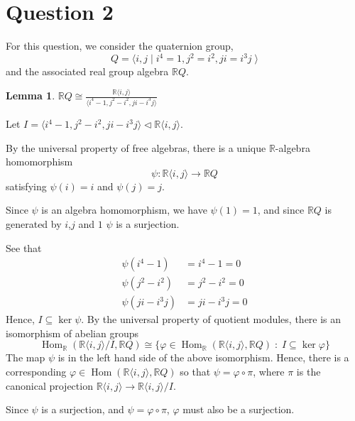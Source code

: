\documentclass[10pt]{article}
\newtheorem{lemma}[theorem]{Lemma}
\newenvironment{proof}[1][Proof]{\begin{trivlist}
\item[\hskip \labelsep {\bfseries #1}]}{\end{trivlist}}
\newcommand{\isom}{\cong}
\newcommand{\Hom}{\operatorname{Hom}}
\begin{document}
\section*{Question 2}
For this question, we consider the quaternion group,
\begin{equation*}
    Q = \langle i,j\;|\;i^4 = 1,j^2 = i^2,ji = i^3j\;\rangle
\end{equation*}
and the associated real group algebra $\mathbb{R}Q$.
\begin{lemma}
    $\mathbb{R}Q \isom \frac{\mathbb{R}\langle i,j\rangle}{\langle i^4-1,j^2-i^2,ji-i^3j\rangle}$
\end{lemma}
\begin{proof}
    Let $I = \langle i^4-1,j^2-i^2,ji-i^3j\rangle \lhd \mathbb{R}\langle i,j\rangle$. 
    
    By the universal property of free algebras, there is a unique $\mathbb{R}$-algebra
    homomorphism 
    \begin{equation*}
        \psi:\mathbb{R}\langle i,j\rangle \rightarrow \mathbb{R}Q
    \end{equation*}
    satisfying $\psi(i) = i$ and $\psi(j) = j$. 
    
    Since $\psi$ is an algebra homomorphism, we have $\psi(1) = 1$,
    and since $\mathbb{R}Q$ is generated by $i$,$j$ and $1$ 
    $\psi$ is a surjection.
    
    See that
    \begin{align*}
        \psi(i^4-1) &= i^4-1 = 0\\
        \psi(j^2-i^2) &= j^2-i^2 = 0\\
        \psi(ji-i^3j) &= ji-i^3j = 0
    \end{align*}
    Hence, $I\subseteq \ker\psi$. By the universal property of quotient modules,
    there is an isomorphism of abelian groups
    \begin{equation*}
        \Hom_\mathbb{R}(\mathbb{R}\langle i,j\rangle/I,\mathbb{R}Q) \isom \{\varphi\in\Hom_\mathbb{R}(\mathbb{R}\langle i,j\rangle,\mathbb{R}Q)\;:\;I\subseteq \ker\varphi\}
    \end{equation*}
    The map $\psi$ is in the left hand side of the above isomorphism. Hence, there is a corresponding
    $\varphi\in\Hom(\mathbb{R}\langle i,j\rangle,\mathbb{R}Q)$ so that $\psi = \varphi\circ\pi$,
    where $\pi$ is the canonical projection $\mathbb{R}\langle i,j\rangle \rightarrow \mathbb{R}\langle i,j\rangle/I$.
    
    Since $\psi$ is a surjection, and $\psi = \varphi\circ\pi$, $\varphi$
    must also be a surjection.
    

\end{proof}
\end{document}
